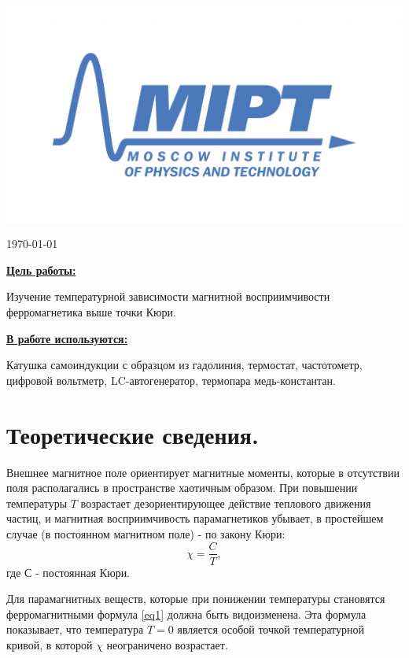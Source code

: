 \documentclass[a4paper, 12pt, twoside]{article}
\newenvironment{bottompar}{\par\vspace*{\fill}}{\clearpage}
\begin{document}
\begin{titlepage}
\begin{bottompar}
	\begin{center}
		\includegraphics[width = 80 mm]{logo.jpg}
	\end{center}
	{\large \today}

\end{bottompar}
\vfill %

\end{titlepage}

{\Large \uline { \textbf  {Цель работы:}}}

\vspace{2mm}
Изучение температурной зависимости магнитной восприимчивости ферромагнетика выше точки Кюри.
\vspace{\baselineskip}

{\Large \uline { \textbf  {В работе используются:}}}

\vspace{2mm}

Катушка самоиндукции с образцом из гадолиния, термостат, частотометр, цифровой вольтметр, LC-автогенератор, термопара медь-константан.

\section{Теоретические сведения.}
Внешнее магнитное поле ориентирует магнитные моменты, которые в отсутствии поля располагались в пространстве хаотичным образом.
При повышении температуры $T$ возрастает дезориентирующее действие теплового движения частиц, и магнитная восприимчивость парамагнетиков убывает, в простейшем случае (в постоянном магнитном поле) - по закону Кюри: 
\begin{equation}
\chi = \dfrac{C}{T}, \label{eq1}
\end{equation}
где С - постоянная Кюри.

Для парамагнитных веществ, которые при понижении температуры становятся ферромагнитными формула \eqref{eq1} должна быть видоизменена. Эта формула показывает, что температура $T=0$ является особой точкой температурной кривой, в которой $\chi$ неограничено возрастает.
\end{document}
